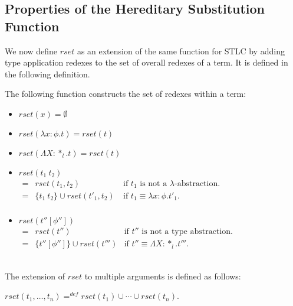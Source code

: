 \subsection{Properties of the Hereditary Substitution Function}
\label{sec:properties_of_the_hereditary_substitution_function_ssf}
We now define $rset$ as an extension of the same function for STLC by
adding type application redexes to the set of overall redexes
of a term.  It is defined in the following definition.  
\begin{definition}
  \label{def:rset_ssf}
  The following function constructs the set of redexes within a term:
  \begin{center}
    \begin{itemize}
    \item[] $rset(x) = \emptyset$\\
    \item[] $rset(\lambda x:\phi.t) = rset(t)$\\
    \item[] $rset(\Lambda X:*_l.t) = rset(t)$\\
    \item[] $rset(t_1\ t_2)$\\
      \begin{math}
        \begin{array}{lll}
          = & rset(t_1, t_2) & \text{if } t_1 \text{ is not a } \lambda \text{-abstraction.}\\
          = & \{t_1\ t_2\} \cup rset(t'_1, t_2)\ & \text{if } t_1 \equiv \lambda x:\phi.t'_1.\\
        \end{array}
      \end{math}
    \item[] $rset(t''[\phi''])$\\
      \begin{math}
        \begin{array}{lll}
          = & rset(t'') & \text{if } t'' \text{ is not a type abstraction.}\\
          = & \{t''[\phi'']\} \cup rset(t''') & \text{if } t'' \equiv \Lambda X:*_l.t'''.
        \end{array}
      \end{math}
    \end{itemize}
  \end{center}
  \ \\
  The extension of $rset$ to multiple arguments is defined as follows:
  \begin{center}
    $rset(t_1, \ldots, t_n) =^{def} rset(t_1) \cup \cdots \cup rset(t_n)$.
  \end{center}
\end{definition}
